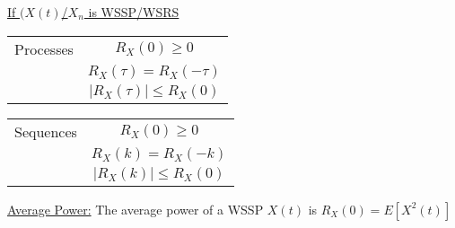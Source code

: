 \documentclass{article}
\begin{document}
	\underline{If $(X(t)$/$X_n$ is WSSP/WSRS}
	\begin{tabular}{|c|c|}
		\hline
		Processes & $R_X(0) \geq 0$ \\ & $R_X(\tau) = R_X(-\tau)$ \\ & $\vert R_X(\tau) \vert \leq R_X(0)$ \\
		\hline  
	\end{tabular}
	\begin{tabular}{|c|c|}
		\hline
		Sequences & $R_X(0) \geq 0$ \\ & $R_X(k) = R_X(-k)$ \\ & $\vert R_X(k) \vert \leq R_X(0)$ \\
		\hline  
	\end{tabular}
	\newline
	\underline{Average Power:} The average power of a WSSP $X(t)$ is $R_X(0) = E[X^2(t)]$
\end{document}
